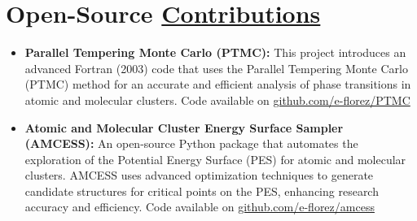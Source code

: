 \section{Open-Source \href{.}{Contributions}}

\begin{itemize}
    \small
    \item \textbf{Parallel Tempering Monte Carlo (PTMC):}
          This project introduces an advanced Fortran (2003) code that uses the Parallel Tempering Monte Carlo (PTMC) method for an accurate and efficient analysis of phase transitions in atomic and molecular clusters. Code available on \href{https://github.com/e-florez/PTMC}{github.com/e-florez/PTMC}

    \item \textbf{Atomic and Molecular Cluster Energy Surface Sampler (AMCESS):}
          An open-source Python package that automates the exploration of the Potential Energy Surface (PES) for atomic and molecular clusters. AMCESS uses advanced optimization techniques to generate candidate structures for critical points on the PES, enhancing research accuracy and efficiency. Code available on
          \href{https://github.com/e-florez/amcess}{github.com/e-florez/amcess}


\end{itemize}